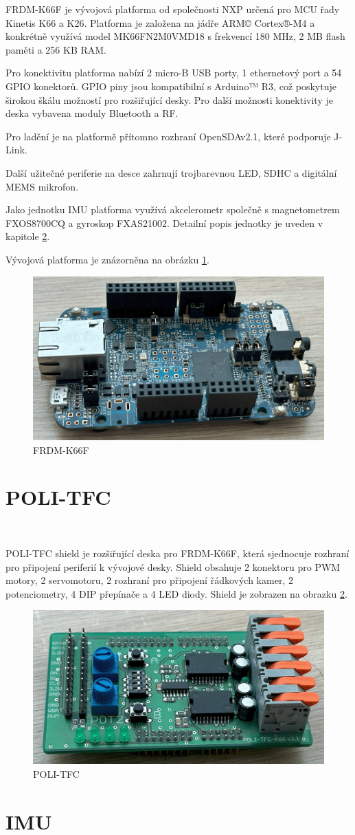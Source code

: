 FRDM-K66F je vývojová platforma od společnosti NXP určená pro MCU řady Kinetis K66 a K26.
Platforma je založena na jádře ARM© Cortex®-M4 a
konkrétně využívá model MK66FN2M0VMD18 s frekvencí 180 MHz, 2 MB flash paměti a 256 KB RAM.

Pro konektivitu platforma nabízí 2 micro-B USB porty, 1 ethernetový port a 54 GPIO konektorů.
GPIO piny jsou kompatibilní s Arduino™ R3, což poskytuje širokou škálu možností pro rozšiřující desky.
Pro další možnosti konektivity je deska vybavena moduly Bluetooth a RF.

Pro ladění je na platformě přítomno rozhraní OpenSDAv2.1, které podporuje J-Link.

Další užitečné periferie na desce zahrnují trojbarevnou LED, SDHC a digitální MEMS mikrofon.

Jako jednotku IMU platforma využívá akcelerometr společně s magnetometrem FXOS8700CQ
a gyroskop FXAS21002. Detailní popis jednotky je uveden v kapitole \ref{sec:IMU}.\cite{frdmk66UserGuide}

Vývojová platforma je znázorněna na obrázku \ref{fig:FRDM-K66F}.
\begin{figure}[h]
    \centering
    \includegraphics[width=0.45\linewidth]{Figures/FRDM-K66F.png}
    \caption{FRDM-K66F}
    \label{fig:FRDM-K66F}
\end{figure}

\section{POLI-TFC}
\label{sec:POLI-TFC}\

POLI-TFC shield je rozšiřující deska pro FRDM-K66F, která sjednocuje rozhraní pro
připojení periferií k vývojové desky. Shield obsahuje 2 konektoru pro PWM motory, 2 servomotoru,
2 rozhraní pro připojení řádkových kamer, 2 potenciometry, 4 DIP přepínače a 4 LED diody.
Shield je zobrazen na obrazku \ref{fig:POLI-TFC}.
\begin{figure}[h]
    \centering
    \includegraphics[width=0.45\linewidth]{Figures/POLI-TFC.png}
    \caption{POLI-TFC}
    \label{fig:POLI-TFC}
\end{figure}

\section{IMU}
\label{sec:IMU}\

\endinput
